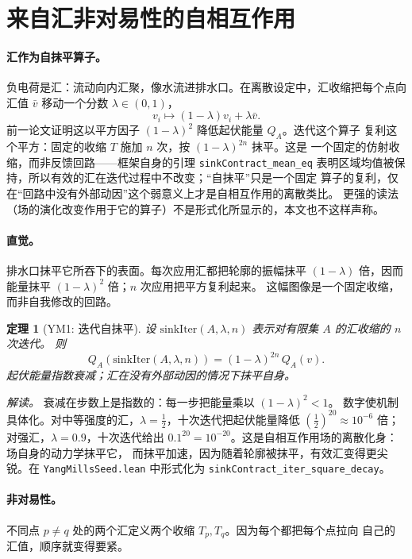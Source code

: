 \documentclass[aps,prd,preprint,superscriptaddress,amsmath,amssymb]{revtex4-2}
\newtheorem{theorem}{定理}[section]
\begin{document}
\section{来自汇非对易性的自相互作用}
\label{sec:selfinteraction}

\paragraph{汇作为自抹平算子。}
负电荷是汇：流动向内汇聚，像水流进排水口。在离散设定中，汇收缩把每个点向汇值
$\bar v$ 移动一个分数 $\lambda\in(0,1)$，
\begin{equation}
v_i\mapsto (1-\lambda)v_i+\lambda\bar v .
\end{equation}
前一论文证明这以平方因子 $(1-\lambda)^2$ 降低起伏能量 $Q_A$。迭代这个算子
复利这个平方：固定的收缩 $T$ 施加 $n$ 次，按 $(1-\lambda)^{2n}$ 抹平。这是
一个固定的仿射收缩，而非反馈回路——框架自身的引理 \texttt{sinkContract\_mean\_eq}
表明区域均值被保持，所以有效的汇在迭代过程中不改变；``自抹平''只是一个固定
算子的复利，仅在``回路中没有外部动因''这个弱意义上才是自相互作用的离散类比。
更强的读法（场的演化改变作用于它的算子）不是形式化所显示的，本文也不这样声称。

\paragraph{直觉。} 排水口抹平它所吞下的表面。每次应用汇都把轮廓的振幅抹平
$(1-\lambda)$ 倍，因而能量抹平 $(1-\lambda)^2$ 倍；$n$ 次应用把平方复利起来。
这幅图像是一个固定收缩，而非自我修改的回路。

\begin{theorem}[YM1: 迭代自抹平]
\label{thm:ym1}
设 $\mathrm{sinkIter}(A,\lambda,n)$ 表示对有限集 $A$ 的汇收缩的 $n$ 次迭代。
则
\begin{equation}
Q_A(\mathrm{sinkIter}(A,\lambda,n)) = (1-\lambda)^{2n}\,Q_A(v).
\end{equation}
起伏能量指数衰减；汇在没有外部动因的情况下抹平自身。
\end{theorem}

\emph{解读。} 衰减在步数上是指数的：每一步把能量乘以 $(1-\lambda)^2<1$。
数字使机制具体化。对中等强度的汇，$\lambda=\tfrac12$，十次迭代把起伏能量降低
$(\tfrac12)^{20}\approx 10^{-6}$ 倍；对强汇，$\lambda=0.9$，十次迭代给出
$0.1^{20}=10^{-20}$。这是自相互作用场的离散化身：场自身的动力学抹平它，
而抹平加速，因为随着轮廓被抹平，有效汇变得更尖锐。在
\texttt{YangMillsSeed.lean} 中形式化为
\texttt{sinkContract\_iter\_square\_decay}。

\paragraph{非对易性。}
不同点 $p\neq q$ 处的两个汇定义两个收缩 $T_p,T_q$。因为每个都把每个点拉向
自己的汇值，顺序就变得要紧。
\end{document}
